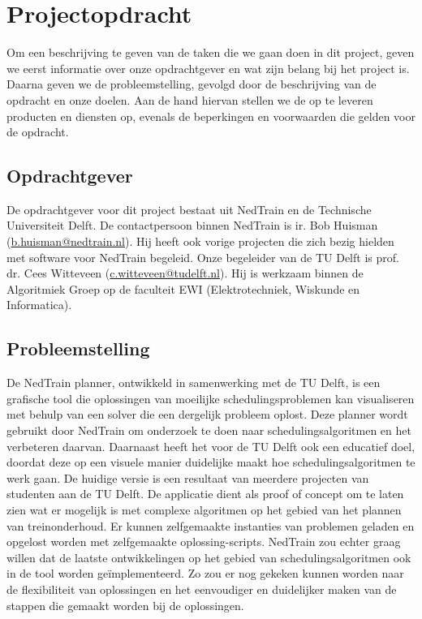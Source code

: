 \section{Projectopdracht}
Om een beschrijving te geven van de taken die we gaan doen in dit project, geven we eerst informatie over onze opdrachtgever en wat zijn belang bij het project is. Daarna geven we de probleemstelling, gevolgd door de beschrijving van de opdracht en onze doelen. Aan de hand hiervan stellen we de op te leveren producten en diensten op, evenals de beperkingen en voorwaarden die gelden voor de opdracht.

\subsection{Opdrachtgever}
De opdrachtgever voor dit project bestaat uit NedTrain en de Technische Universiteit Delft. De contactpersoon binnen NedTrain is ir. Bob Huisman (\href{mailto:b.huisman@nedtrain.nl}{b.huisman@nedtrain.nl}). Hij heeft ook vorige projecten die zich bezig hielden met software voor NedTrain begeleid. Onze begeleider van de TU Delft is prof. dr. Cees Witteveen (\href{mailto:c.witteveen@tudelft.nl}{c.witteveen@tudelft.nl}). Hij is werkzaam binnen de Algoritmiek Groep op de faculteit EWI (Elektrotechniek, Wiskunde en Informatica).

\subsection{Probleemstelling}
De NedTrain planner, ontwikkeld in samenwerking met de TU Delft, is een grafische tool die oplossingen van moeilijke schedulingsproblemen kan visualiseren met behulp van een solver die een dergelijk probleem oplost. Deze planner wordt gebruikt door NedTrain om onderzoek te doen naar schedulingsalgoritmen en het verbeteren daarvan. Daarnaast heeft het voor de TU Delft ook een educatief doel, doordat deze op een visuele manier duidelijke maakt hoe schedulingsalgoritmen te werk gaan. De huidige versie is een resultaat van meerdere projecten van studenten aan de TU Delft. De applicatie dient als proof of concept om te laten zien wat er mogelijk is met complexe algoritmen op het gebied van het plannen van treinonderhoud. Er kunnen zelfgemaakte instanties van problemen geladen en opgelost worden met zelfgemaakte oplossing-scripts. NedTrain zou echter graag willen dat de laatste ontwikkelingen op het gebied van schedulingsalgoritmen ook in de tool worden ge\"implementeerd. Zo zou er nog gekeken kunnen worden naar de flexibiliteit van oplossingen en het eenvoudiger en duidelijker maken van de stappen die gemaakt worden bij de oplossingen. 

